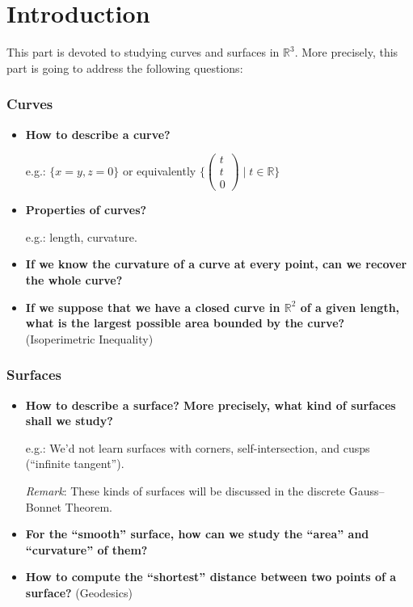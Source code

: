 \chapter{Introduction}




This part is devoted to studying curves and surfaces in $\mathbb{R}^3$. More precisely, this part is going to address the following questions:

\subsection*{Curves}

\begin{itemize}
\item \textbf{How to describe a curve?}

    e.g.: $\{ x = y, z = 0\}$ or equivalently $\{ \begin{pmatrix}
        t\\
        t\\
        0
    \end{pmatrix} \mid t \in \mathbb{R} \}$

\item \textbf{Properties of curves?}

    e.g.: length, curvature.

\item \textbf{If we know the curvature of a curve at every point, can we recover the whole curve?}

\item \textbf{If we suppose that we have a closed curve in $\mathbb{R}^2$ of a given length, what is the largest possible area bounded by the curve?} (Isoperimetric Inequality)
\end{itemize}

\subsection*{Surfaces}

\begin{itemize}
\item \textbf{How to describe a surface? More precisely, what kind of surfaces shall we study?}

    e.g.: We'd not learn surfaces with corners, self-intersection, and cusps (``infinite tangent'').
    
    \emph{Remark}: These kinds of surfaces will be discussed in the discrete Gauss--Bonnet Theorem.

\item \textbf{For the ``smooth'' surface, how can we study the ``area'' and ``curvature'' of them?}

\item \textbf{How to compute the ``shortest'' distance between two points of a surface?} (Geodesics)
\end{itemize}